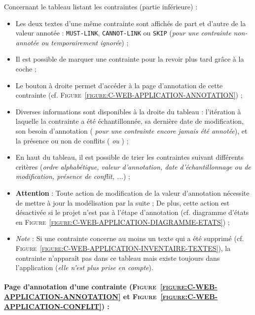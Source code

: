 		Concernant le tableau listant les contraintes (partie inférieure) :
		\begin{itemize}
			\item Les deux textes d'une même contrainte sont affichés de part et d'autre de la valeur annotée : \textcolor{colorApplicationMUSTLINK}{\texttt{MUST-LINK}}, \textcolor{colorApplicationCANNOTLINK}{\texttt{CANNOT-LINK}} ou \texttt{SKIP} (\textit{pour une contrainte non-annotée ou temporairement ignorée}) ;
			\item Il est possible de marquer une contrainte pour la revoir plus tard grâce à la coche \textguillemets{\textcolor{colorApplicationREVIEW}{\faCheckSquare}} ;
			\item Le bouton \textguillemets{\faAngleRight} à droite permet d'accéder à la page d'annotation de cette contrainte (cf. \textsc{Figure~\ref{figure:C-WEB-APPLICATION-ANNOTATION}}) ;
			\item Diverses informations sont disponibles à la droite du tableau : l'itération à laquelle la contrainte a été échantillonnée, sa dernière date de modification, son besoin d'annotation (\textit{\textguillemets{\faQuestion} pour une contrainte encore jamais été annotée}), et la présence ou non de conflits (\textit{\textguillemets{\textcolor{colorApplicationMUSTLINK}{\faCheck}} ou \textguillemets{\textcolor{colorApplicationERROR}{\faExclamation}}}) ;
			\item En haut du tableau, il est possible de trier les contraintes suivant différents critères (\textit{ordre alphabétique, valeur d'annotation, date d'échantillonnage ou de modification, présence de conflit, ...}) ;
			\item \textbf{Attention} : Toute action de modification de la valeur d'annotation nécessite de mettre à jour la modélisation par la suite ;
			De plus, cette action est désactivée si le projet n'est pas à l'étape d'annotation (cf. diagramme d'états en \textsc{Figure~\ref{figure:C-WEB-APPLICATION-DIAGRAMME-ETATS}}) ;
			\item \textit{Note} : Si une contrainte concerne au moins un texte qui a été supprimé (cf. \textsc{Figure~\ref{figure:C-WEB-APPLICATION-INVENTAIRE-TEXTES}}), la contrainte n'apparaît pas dans ce tableau mais existe toujours dans l'application (\textit{elle n'est plus prise en compte}).
		\end{itemize}
	
	
	\newpage
	\paragraph{Page d'annotation d'une contrainte (\textsc{Figure~\ref{figure:C-WEB-APPLICATION-ANNOTATION}} et \textsc{Figure~\ref{figure:C-WEB-APPLICATION-CONFLIT}}) :}
	
